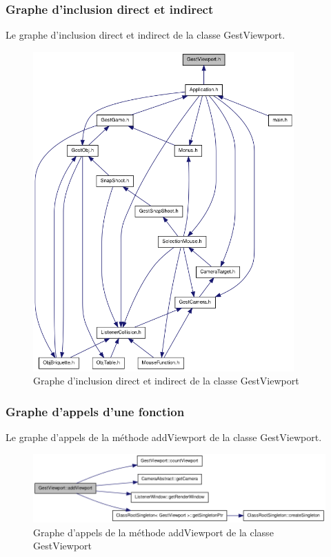 \documentclass[frenchb,twoside]{EPURapport}
\begin{document}
\newpage
			
			\subsubsection{Graphe d'inclusion direct et indirect}
			Le graphe d'inclusion direct et indirect de la classe GestViewport.
			\begin{figure}[h]
				\centering
				\includegraphics[width=10cm]{images/graph_inclusion_gestviewport.png}
				\caption{\label{fig:graph_inclusion_gestviewport}Graphe d'inclusion direct et indirect de la classe GestViewport}
			\end{figure}
			
			
			\subsubsection{Graphe d'appels d'une fonction}
			Le graphe d'appels de la méthode addViewport de la classe GestViewport.
			\begin{figure}[h]
				\centering
				\includegraphics[width=15cm]{images/graph_appels_addviewport_gestviewport.png}
				\caption{\label{fig:graph_appels_addviewport_gestviewport}Graphe d'appels de la méthode addViewport de la classe GestViewport}
			\end{figure}
    
\end{document}
